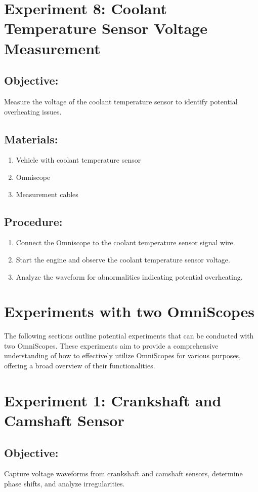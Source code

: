 \documentclass[]{scrreprt}
\begin{document}
    \section*{Experiment 8: Coolant Temperature Sensor Voltage Measurement}
    \subsection*{Objective:} Measure the voltage of the coolant temperature sensor to identify potential overheating issues.
    \subsection*{Materials:}
    \begin{enumerate}
        \item Vehicle with coolant temperature sensor
        \item Omniscope
        \item Measurement cables
    \end{enumerate}
    \subsection*{Procedure:}
    \begin{enumerate}
        \item Connect the Omniscope to the coolant temperature sensor signal wire.
        \item Start the engine and observe the coolant temperature sensor voltage.
        \item Analyze the waveform for abnormalities indicating potential overheating.
    \end{enumerate}



    \section{Experiments with two OmniScopes}
    The following sections outline potential experiments that can be conducted with two OmniScopes. 
    These experiments aim to provide a comprehensive understanding of how to effectively utilize OmniScopes for various purposes, offering a broad overview of their functionalities.
    \section*{Experiment 1: Crankshaft and Camshaft Sensor}
    \subsection*{Objective:} Capture voltage waveforms from crankshaft and camshaft sensors, determine phase shifts, and analyze irregularities.
\end{document}
